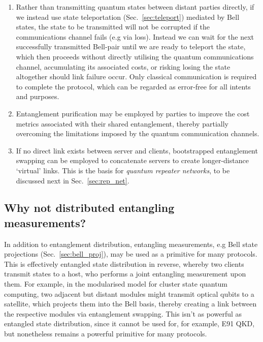 \begin{enumerate}
\item Rather than transmitting quantum states between distant parties directly, if we instead use state teleportation (Sec.~\ref{sec:teleport}) mediated by Bell states, the state to be transmitted will not be corrupted if the communications channel fails (e.g via loss). Instead we can wait for the next successfully transmitted Bell-pair until we are ready to teleport the state, which then proceeds without directly utilising the quantum communications channel, accumulating its associated costs, or risking losing the state altogether should link failure occur. Only classical communication is required to complete the protocol, which can be regarded as error-free for all intents and purposes.
\item Entanglement purification may be employed by parties to improve the cost metrics associated with their shared entanglement, thereby partially overcoming the limitations imposed by the quantum communication channels.
\item If no direct link exists between server and clients, bootstrapped entanglement swapping can be employed to concatenate servers to create longer-distance `virtual' links. This is the basis for \textit{quantum repeater networks}, to be discussed next in Sec.~\ref{sec:rep_net}.
\end{enumerate}


%
%

\subsection{Why not distributed entangling measurements?}

In addition to entanglement distribution, entangling measurements, e.g Bell state projections (Sec.~\ref{sec:bell_proj}), may be used as a primitive for many protocols. This is effectively entangled state distribution in reverse, whereby two clients transmit states to a host, who performs a joint entangling measurement upon them. For example, in the modularised model for cluster state quantum computing, two adjacent but distant modules might transmit optical qubits to a satellite, which projects them into the Bell basis, thereby creating a link between the respective modules via entanglement swapping. This isn't as powerful as entangled state distribution, since it cannot be used for, for example, E91 QKD, but nonetheless remains a powerful primitive for many protocols.

